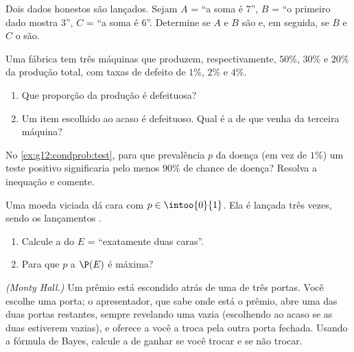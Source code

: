 \begin{exercise}[$\star$]\label{exo:g12:condprob:3}
Dois dados honestos são lançados. Sejam $A$ = ``a soma é $7$'',
$B$ = ``o primeiro dado mostra $3$'', $C$ = ``a soma é $6$''. Determine se
$A$ e $B$ são  e, em seguida, se $B$ e $C$ o são.
\end{exercise}

\begin{exercise}[$\star\star$]\label{exo:g12:condprob:4}
Uma fábrica tem três máquinas que produzem, respectivamente, $50\%$,
$30\%$ e $20\%$ da produção total, com taxas de defeito de $1\%$, $2\%$ e
$4\%$.
\begin{enumerate}
  \item Que proporção da produção é defeituosa?
  \item Um item escolhido ao acaso é defeituoso. Qual é a  de
        que venha da terceira máquina?
\end{enumerate}
\end{exercise}

\begin{exercise}[$\star\star$]\label{exo:g12:condprob:5}
No \cref{ex:g12:condprob:test}, para que prevalência $p$ da doença (em vez
de $1\%$) um teste positivo significaria pelo menos $90\%$ de chance de
doença? Resolva a inequação e comente.
\end{exercise}

\begin{exercise}[$\star\star$]\label{exo:g12:condprob:6}
Uma moeda viciada dá cara com  $p \in \intoo{0}{1}$. Ela é
lançada três vezes, sendo os lançamentos .
\begin{enumerate}
  \item Calcule a  do  $E$ = ``exatamente duas caras''.
  \item Para que $p$ a  $\P(E)$ é máxima?
\end{enumerate}
\end{exercise}

\begin{exercise}[$\star\star\star$]\label{exo:g12:condprob:7}
\emph{(Monty Hall.)} Um prêmio está escondido atrás de uma de três portas.
Você escolhe uma porta; o apresentador, que sabe onde está o prêmio, abre
uma das duas portas restantes, sempre revelando uma vazia (escolhendo ao
acaso se as duas estiverem vazias), e oferece a você a troca pela outra
porta fechada. Usando a fórmula de Bayes, calcule a  de
ganhar se você trocar e se não trocar.
\end{exercise}

